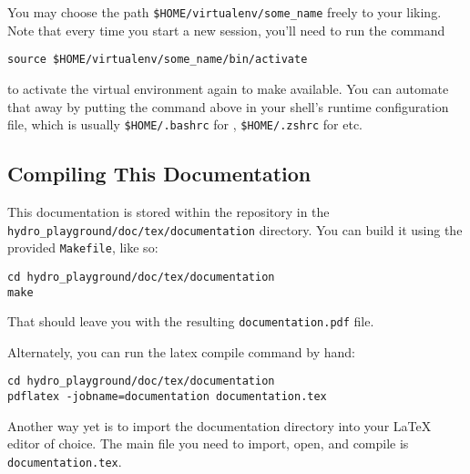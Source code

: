 You may choose the path \verb|$HOME/virtualenv/some_name| freely to your liking.
Note that every time you start a new session, you'll need to run the command

\begin{lstlisting}
source $HOME/virtualenv/some_name/bin/activate
\end{lstlisting}

to activate the virtual environment again to make 
available. You can automate that away by putting the command above in your
shell's runtime configuration file, which is usually \verb|$HOME/.bashrc| for
, \verb|$HOME/.zshrc| for  etc.









\subsection{Compiling This Documentation}\label{chap:documentation}


This documentation is stored within the repository in the
\verb|hydro_playground/doc/tex/documentation| directory. You can build it using
the provided \verb|Makefile|, like so:


\begin{lstlisting}
cd hydro_playground/doc/tex/documentation
make
\end{lstlisting}

That should leave you with the resulting \verb|documentation.pdf| file.

Alternately, you can run the latex compile command by hand:

\begin{lstlisting}
cd hydro_playground/doc/tex/documentation
pdflatex -jobname=documentation documentation.tex
\end{lstlisting}

Another way yet is to import the documentation directory into your LaTeX editor
of choice. The main file you need to import, open, and compile is
\verb|documentation.tex|.









